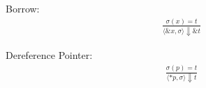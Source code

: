 \documentclass[12pt]{article}
\begin{document}
	Borrow:
	\begin{align*}
		\frac{
			\sigma(x) = t
		}
		{\langle \&x, \sigma \rangle\Downarrow \&t}
	\end{align*}
	
	Dereference Pointer:
	\begin{align*}
		\frac{
			\sigma(p) = t
		}
		{\langle *p, \sigma \rangle\Downarrow t}
	\end{align*}


%
%
%
%
%	
\end{document}

